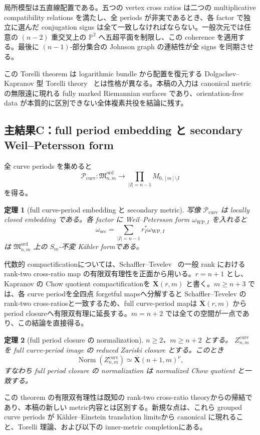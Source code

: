 \documentclass[11pt,a4paper]{ltjsarticle}
\newcommand{\PP}{\mathbb P}
\newcommand{\Norm}{\operatorname{Norm}}
\newcommand{\ov}{\overline}
\newcommand{\cP}{\mathcal P}
\newcommand{\Mord}{\mathfrak M^{\mathrm{ord}}}
\theoremstyle{plain}
\newtheorem{theorem}{定理}[section]
\theoremstyle{definition}
\theoremstyle{remark}
\begin{document}
局所模型は五直線配置である。五つの vertex cross ratios は二つの multiplicative compatibility relations を満たし、全 periods が非実であるとき、各 factor で独立に選んだ conjugation signs は全て一致しなければならない。一般次元では任意の $(n-2)$ 重交叉上の $\PP^2$ へ五超平面を制限し、この coherence を適用する。最後に $(n-1)$-部分集合の Johnson graph の連結性が全 signs を同期させる。

この Torelli theorem は logarithmic bundle から配置を復元する Dolgachev--Kapranov 型 Torelli theory~\cite{DK,DolgachevLog,FMV} とは性格が異なる。本稿の入力は canonical metric の無限遠に現れる fully marked Riemannian surfaces であり、orientation-free data が本質的に区別できない全体複素共役を結論に残す。

\subsection{主結果C：full period embedding と secondary Weil--Petersson form}
全 curve periods を集めると
\begin{equation}
\label{eq:intro-fullperiod}
 \cP_{\mathrm{curv}}:\Mord_{n,m}\longrightarrow
 \prod_{|I|=n-1}M_{0,[m]\setminus I}
\end{equation}
を得る。

\begin{theorem}[full curve-period embedding と secondary metric]
\label{thm:intro-period}
写像 $\cP_{\mathrm{curv}}$ は locally closed embedding である。各 factor に Weil--Petersson form $\omega_{\mathrm{WP},I}$ を入れると
\[
 \omega_{\mathrm{sec}}=
 \sum_{|I|=n-1}r_I^*\omega_{\mathrm{WP},I}
\]
は $\Mord_{n,m}$ 上の $S_m$-不変 K\"ahler formである。
\end{theorem}

代数的 compactificationについては、Schaffler--Tevelev~\cite[Corollary~3.5]{ST} の一般 rank における rank-two cross-ratio map の有限双有理性を正面から用いる。$r=n+1$ とし、Kapranov の Chow quotient compactificationを $\ov{\mathbf X}(r,m)$ と書く。$m\ge n+3$ では、各 curve periodを全四点 forgetful mapsへ分解すると Schaffler--Tevelev の rank-two cross-ratiosと一致するため、full curve-period mapは $\ov{\mathbf X}(r,m)$ から period closureへ有限双有理に延長する。$m=n+2$ では全ての空間が一点であり、この結論を直接得る。

\begin{theorem}[full period closure の normalization]
\label{thm:intro-compactification}
$n\ge2$、$m\ge n+2$ とする。
$Z_{n,m}^{\mathrm{curv}}$ を full curve-period image の reduced Zariski closure とする。このとき
\[
 \Norm(Z_{n,m}^{\mathrm{curv}})
 \simeq \ov{\mathbf X}(n+1,m)^{\nu},
\]
すなわち full period closure の normalization は normalized Chow quotient と一致する。
\end{theorem}
この theorem の有限双有理性は既知の rank-two cross-ratio theoryからの帰結であり、本稿の新しい metric内容とは区別する。新規な点は、これら grouped curve periods が K\"ahler--Einstein translation limitsから canonical に現れること、Torelli 理論、および以下の inner-metric completionにある。
\end{document}
